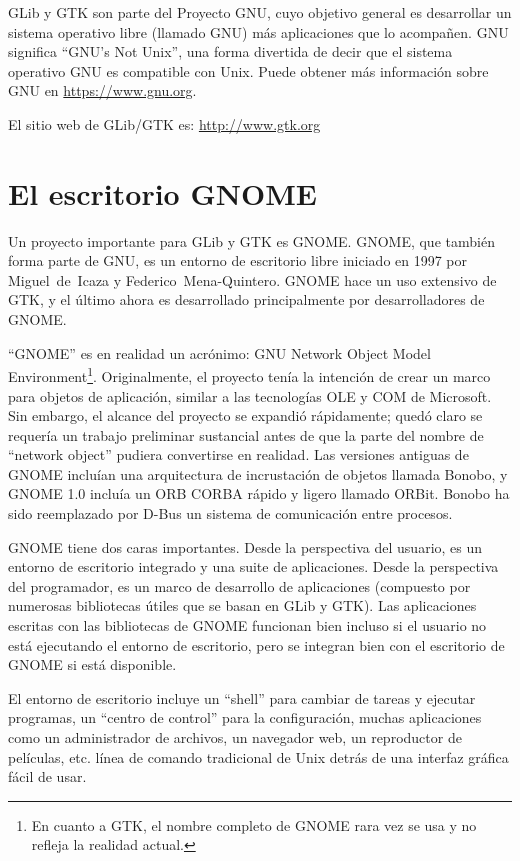 GLib y GTK son parte del Proyecto GNU, cuyo objetivo general es desarrollar un sistema operativo libre (llamado GNU) más aplicaciones que lo acompañen. GNU significa ``GNU's Not Unix'', una forma divertida de decir que el sistema operativo GNU es compatible con Unix. Puede obtener más información sobre GNU en \url{https://www.gnu.org}.

El sitio web de GLib/GTK es: \url{http://www.gtk.org}

\section{El escritorio GNOME}

Un proyecto importante para GLib y GTK es GNOME. GNOME, que también forma parte de GNU, es un entorno de escritorio libre iniciado en 1997 por Miguel~de~Icaza y Federico~Mena-Quintero. GNOME hace un uso extensivo de GTK, y el último ahora es desarrollado principalmente por desarrolladores de GNOME.

``GNOME'' es en realidad un acrónimo: GNU Network Object Model Environment\footnote{En cuanto a GTK, el nombre completo de GNOME rara vez se usa y no refleja la realidad actual.}. Originalmente, el proyecto tenía la intención de crear un marco para objetos de aplicación, similar a las tecnologías OLE y COM de Microsoft. Sin embargo, el alcance del proyecto se expandió rápidamente; quedó claro se requería un trabajo preliminar sustancial antes de que la parte del nombre de ``network object'' pudiera convertirse en realidad. Las versiones antiguas de GNOME incluían una arquitectura de incrustación de objetos llamada Bonobo, y GNOME 1.0 incluía un ORB CORBA rápido y ligero llamado ORBit. Bonobo ha sido reemplazado por D-Bus un sistema de comunicación entre procesos.

GNOME tiene dos caras importantes. Desde la perspectiva del usuario, es un entorno de escritorio integrado y una suite de aplicaciones. Desde la perspectiva del programador, es un marco de desarrollo de aplicaciones (compuesto por numerosas bibliotecas útiles que se basan en GLib y GTK). Las aplicaciones escritas con las bibliotecas de GNOME funcionan bien incluso si el usuario no está ejecutando el entorno de escritorio, pero se integran bien con el escritorio de GNOME si está disponible.

El entorno de escritorio incluye un ``shell'' para cambiar de tareas y ejecutar programas, un ``centro de control'' para la configuración, muchas aplicaciones como un administrador de archivos, un navegador web, un reproductor de películas, etc. línea de comando tradicional de Unix detrás de una interfaz gráfica fácil de usar.

